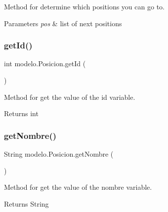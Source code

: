 Method for determine which positions you can go to. 


\begin{DoxyParams}{Parameters}
{\em pos} & list of next positions \\
\hline
\end{DoxyParams}
\mbox{\label{classmodelo_1_1_posicion_ad81fc23f1ccae2caa6fe85ed510d8925}} 
\subsubsection{\texorpdfstring{get\+Id()}{getId()}}
{\footnotesize\ttfamily int modelo.\+Posicion.\+get\+Id (\begin{DoxyParamCaption}{ }\end{DoxyParamCaption})}



Method for get the value of the id variable. 

\begin{DoxyReturn}{Returns}
int 
\end{DoxyReturn}
\mbox{\label{classmodelo_1_1_posicion_af349bd584f20e43466bdc838469f95df}} 
\subsubsection{\texorpdfstring{get\+Nombre()}{getNombre()}}
{\footnotesize\ttfamily String modelo.\+Posicion.\+get\+Nombre (\begin{DoxyParamCaption}{ }\end{DoxyParamCaption})}



Method for get the value of the nombre variable. 

\begin{DoxyReturn}{Returns}
String 
\end{DoxyReturn}
\mbox{\label{classmodelo_1_1_posicion_acaad3114bb7123d7b9c75c82a50d5a4e}} 
